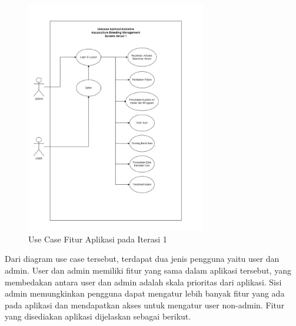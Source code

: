\begin{figure}[H]
	\centering
	\includegraphics[width=0.7\textwidth]{gambar/akbar/usecase_iterasi_1.jpeg}
	\caption{Use Case Fitur Aplikasi pada Iterasi 1}
\end{figure}

Dari diagram use case tersebut, terdapat dua jenis pengguna yaitu user dan admin. User dan admin memiliki fitur yang sama dalam aplikasi tersebut, yang membedakan antara user dan admin adalah skala prioritas dari aplikasi. Sisi admin memungkinkan pengguna dapat mengatur lebih banyak fitur yang ada pada aplikasi dan mendapatkan akses untuk mengatur user non-admin. Fitur yang disediakan aplikasi dijelaskan sebagai berikut.

